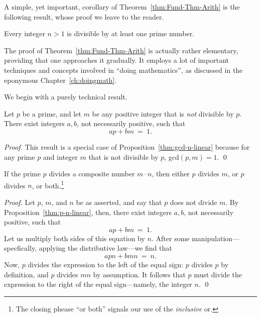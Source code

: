 A simple, yet important, corollary of Theorem~\ref{thm:Fund-Thm-Arith}
is the following result, whose proof we leave to the reader.

\begin{prop}
\label{thm:prime-divisor}
Every integer $n>1$ is divisible by at least one prime number.
\end{prop}

\bigskip

%
The proof of Theorem~\ref{thm:Fund-Thm-Arith} is actually rather
elementary, providing that one approaches it gradually.  It employs a
lot of important techniques and concepts involved in ``doing
mathematics'', as discussed in the eponymous
Chapter~\ref{ch:doingmath}.

We begin with a purely technical result.

\begin{prop}
\label{thm:p-n-linear}
Let $p$ be a prime, and let $m$ be any positive integer that is {\em
  not} divisible by $p$.  There exist integers $a, b$, not necessarily
positive, such that
\[ ap + bm \ = \ 1. \]
\end{prop}

\begin{proof}
This result is a special case of Proposition~\ref{thm:gcd-n-linear}
because for any prime $p$ and integer $m$ that is not divisible by
$p$, {\sc gcd}$(p, m) = 1$.
\qed
\end{proof}

\begin{prop}
\label{thm:p-divides-onefactor}
If the prime $p$ divides a composite number $m \cdot n$, then either
$p$ divides $m$, or $p$ divides $n$, or both.\footnote{The closing
  phease ``or both'' signals our use of the {\em inclusive} or.}
\end{prop}

\begin{proof}
Let $p$, $m$, and $n$ be as asserted, and say that $p$ does not divide
$m$.  By Proposition~\ref{thm:p-n-linear}, then, there exist integers
$a, b$, not necessarily positive, such that
\[ ap + bm \ = \ 1. \]
Let us multiply both sides of this equation by $n$.  After some
manipulation---specfically, applying the distributive law---we find
that
\[ apn + bmn \ = \ n. \]
Now, $p$ divides the expression to the left of the equal sign: $p$
divides $p$ by definition, and $p$ divides $mn$ by assumption.  It
follows that $p$ must divide the expression to the right of the equal
sign---namely, the integer $n$.  \qed
\end{proof}

